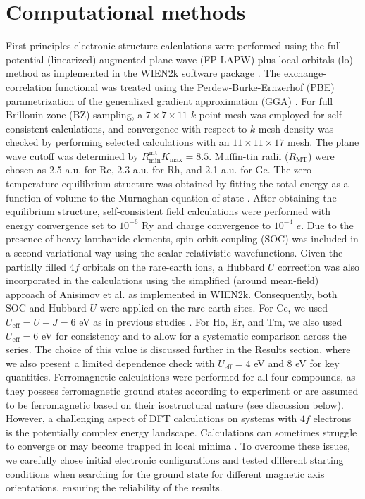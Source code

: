 \documentclass[preprint,12pt]{elsarticle}
\begin{document}
\section{Computational methods}

First-principles electronic structure calculations were performed using the full-potential (linearized) augmented plane wave (FP-LAPW) plus local orbitals (lo) method as implemented in the WIEN2k software package \cite{blaha2001wien2k, madsen2001efficient}. The exchange-correlation functional was treated using the Perdew-Burke-Ernzerhof (PBE) parametrization of the generalized gradient approximation (GGA) \cite{perdew1996generalized}. For full Brillouin zone (BZ) sampling, a $7 \times 7 \times 11$ $k$-point mesh \cite{monkhorst1976special} was employed for self-consistent calculations, and convergence with respect to $k$-mesh density was checked by performing selected calculations with an $11 \times 11 \times 17$ mesh. The plane wave cutoff was determined by $R_{\text{min}}^{\text{mt}}K_{\text{max}} = 8.5$. Muffin-tin radii ($R_{\text{MT}}$) were chosen as 2.5 a.u. for Re, 2.3 a.u. for Rh, and 2.1 a.u. for Ge. The zero-temperature equilibrium structure was obtained by fitting the total energy as a function of volume to the Murnaghan equation of state \cite{murnaghan1944compressibility}. After obtaining the equilibrium structure, self-consistent field calculations were performed with energy convergence set to $10^{-6}$ Ry and charge convergence to $10^{-4}$ $e$. Due to the presence of heavy lanthanide elements, spin-orbit coupling (SOC) was included in a second-variational way using the scalar-relativistic wavefunctions. Given the partially filled $4f$ orbitals on the rare-earth ions, a Hubbard $U$ correction was also incorporated in the calculations using the simplified (around mean-field) approach of Anisimov et al. \cite{anisimov1997first} as implemented in WIEN2k. Consequently, both SOC and Hubbard $U$ were applied on the rare-earth sites. For Ce, we used $U_{\text{eff}} = U - J = 6$ eV as in previous studies \cite{wu2021anisotropic}. For Ho, Er, and Tm, we also used $U_{\text{eff}} = 6$ eV for consistency and to allow for a systematic comparison across the series. The choice of this value is discussed further in the Results section, where we also present a limited dependence check with $U_{\text{eff}} = 4$ eV and $8$ eV for key quantities. Ferromagnetic calculations were performed for all four compounds, as they possess ferromagnetic ground states according to experiment or are assumed to be ferromagnetic based on their isostructural nature (see discussion below). However, a challenging aspect of DFT calculations on systems with $4f$ electrons is the potentially complex energy landscape. Calculations can sometimes struggle to converge or may become trapped in local minima \cite{dorado2013advances}. To overcome these issues, we carefully chose initial electronic configurations and tested different starting conditions when searching for the ground state for different magnetic axis orientations, ensuring the reliability of the results.
\end{document}
